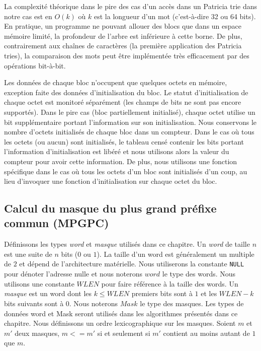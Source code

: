 La complexité théorique dans le pire des cas d'un accès dans un Patricia trie
dans notre cas est en $O(k)$ où $k$ est la longueur d'un mot (c'est-à-dire
32 ou 64 bits).
En pratique, un programme ne pouvant allouer des blocs que dans un
espace mémoire limité, la profondeur de l'arbre est inférieure à cette borne.
De plus, contrairement aux chaînes de caractères (la première application des
Patricia tries), la comparaison des mots peut être implémentée très
efficacement par des opérations bit-à-bit.

Les données de chaque bloc n'occupent que quelques octets en mémoire, exception
faite des données d'initialisation du bloc.
Le statut d'initialisation de chaque octet est monitoré séparément (les champs
de bits ne sont pas encore supportés).
Dans le pire cas (bloc partiellement initialisé), chaque octet utilise un bit
supplémentaire portant l'information sur son initialisation.
Nous conservons le nombre d'octets initialisés de chaque bloc dans un
compteur.
Dans le cas où tous les octets (ou aucun) sont initialisés, le tableau censé
contenir les bits portant l'information d'initialisation est libéré et nous
utilisons alors la valeur du compteur pour avoir cette information.
De plus, nous utilisons une fonction spécifique dans le cas où tous les octets
d'un bloc sont initialisés d'un coup, au lieu d'invoquer une fonction
d'initialisation sur chaque octet du bloc.


\subsection{Calcul du masque du plus grand préfixe commun (MPGPC)}
\label{sec:mpgpc}

%

Définissons les types {\em word} et {\em masque} utilisés dans ce chapitre.
Un {\em word} de taille $n$ est une suite de $n$ bits ($0$ ou $1$).
La taille d'un word est généralement un multiple de $2$ et dépend de
l'architecture matérielle.
Nous utiliserons la constante \lstinline'NULL' pour dénoter l'adresse
nulle et nous noterons $word$ le type des words.
Nous utilisons une constante $WLEN$ pour faire référence à la taille des words.
Un {\em masque} est un word dont les $k \le WLEN$ premiers bits sont à $1$ et
les $WLEN-k$ bits suivants sont à $0$.
Nous noterons $Mask$ le type des masques.
Les types de données word et Mask seront utilisés dans les algorithmes présentés
dans ce chapitre.
Nous définissons un ordre lexicographique sur les masques.
Soient $m$ et $m'$ deux masques, $m <= m'$ si et seulement si $m'$ contient au
moins autant de $1$ que $m$.

